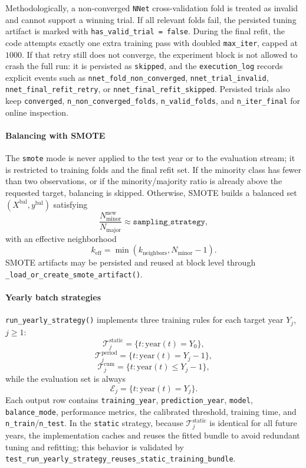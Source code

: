 Methodologically, a non-converged \texttt{NNet} cross-validation fold is treated as invalid and cannot support a winning trial. If all relevant folds fail, the persisted tuning artifact is marked with \texttt{has\_valid\_trial = false}. During the final refit, the code attempts exactly one extra training pass with doubled \texttt{max\_iter}, capped at \(1000\). If that retry still does not converge, the experiment block is not allowed to crash the full run: it is persisted as \texttt{skipped}, and the \texttt{execution\_log} records explicit events such as \texttt{nnet\_fold\_non\_converged}, \texttt{nnet\_trial\_invalid}, \texttt{nnet\_final\_refit\_retry}, or \texttt{nnet\_final\_refit\_skipped}. Persisted trials also keep \texttt{converged}, \texttt{n\_non\_converged\_folds}, \texttt{n\_valid\_folds}, and \texttt{n\_iter\_final} for online inspection.

\paragraph{Balancing with SMOTE}
The \texttt{smote} mode is never applied to the test year or to the evaluation stream; it is restricted to training folds and the final refit set. If the minority class has fewer than two observations, or if the minority/majority ratio is already above the requested target, balancing is skipped. Otherwise, SMOTE builds a balanced set \((X^{\mathrm{bal}}, y^{\mathrm{bal}})\) satisfying
\[
\frac{N_{\mathrm{minor}}^{\mathrm{new}}}{N_{\mathrm{major}}}
 \approx
\texttt{sampling\_strategy},
\]
with an effective neighborhood
\[
k_{\mathrm{eff}} = \min(k_{\mathrm{neighbors}}, N_{\mathrm{minor}} - 1).
\]
SMOTE artifacts may be persisted and reused at block level through \texttt{\_load\_or\_create\_smote\_artifact()}.

\paragraph{Yearly batch strategies}
\texttt{run\_yearly\_strategy()} implements three training rules for each target year \(Y_j\), \(j \ge 1\):
\[
\mathcal{T}^{\mathrm{static}}_j = \{t : \mathrm{year}(t)=Y_0\},
\]
\[
\mathcal{T}^{\mathrm{period}}_j = \{t : \mathrm{year}(t)=Y_j - 1\},
\]
\[
\mathcal{T}^{\mathrm{cum}}_j = \{t : \mathrm{year}(t)\le Y_j - 1\},
\]
while the evaluation set is always
\[
\mathcal{E}_j = \{t : \mathrm{year}(t)=Y_j\}.
\]
Each output row contains \texttt{training\_year}, \texttt{prediction\_year}, \texttt{model}, \texttt{balance\_mode}, performance metrics, the calibrated threshold, training time, and \texttt{n\_train}/\texttt{n\_test}. In the \texttt{static} strategy, because \(\mathcal{T}^{\mathrm{static}}_j\) is identical for all future years, the implementation caches and reuses the fitted bundle to avoid redundant tuning and refitting; this behavior is validated by \texttt{test\_run\_yearly\_strategy\_reuses\_static\_training\_bundle}.

